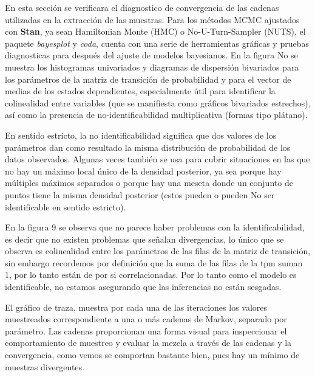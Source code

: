 \documentclass[a4paper]{article}\usepackage[]{graphicx}\usepackage[]{color}
\begin{document}
En esta sección se verificara el diagnostico de convergencia de las cadenas utilizadas en la extracción de las muestras. Para los métodos MCMC ajustados con \textbf{Stan}, ya sean Hamiltonian Monte (HMC) o No-U-Turn-Sampler (NUTS), el paquete \emph{bayesplot} y \emph{coda}, cuenta con una serie de herramientas gráficas y pruebas diagnosticas para después del ajuste de modelos bayesianos. En la figura No se muestra los histogramas univariados y diagramas de dispersión bivariados para los parámetros de la matriz de transición de probabilidad y para el vector de medias de los estados dependientes, especialmente útil para identificar la colinealidad entre variables (que se manifiesta como gráficos bivariados estrechos), así como la presencia de no-identificabilidad multiplicativa (formas tipo plátano).

En sentido estricto, la no identificabilidad significa que dos valores de los parámetros dan como resultado la misma distribución de probabilidad de los datos observados. Algunas veces también se usa para cubrir situaciones en las que no hay un máximo local único de la densidad posterior, ya sea porque hay múltiples máximos separados o porque hay una meseta donde un conjunto de puntos tiene la misma densidad posterior (estos pueden o pueden No ser identificable en sentido estricto).

En la figura 9 se observa que no parece haber problemas con la identificabilidad, es decir que no existen problemas que señalan divergencias, lo único que se observa es colinealidad entre los parámetros de las filas de la matriz de transición, sin embargo recordemos por definición que la suma de las filas de la tpm suman 1, por lo tanto están de por si correlacionadas. Por lo tanto como el modelo es identificable, no estamos asegurando que las inferencias no están sesgadas.

\vspace{5mm} %

El gráfico de traza, muestra por cada una de las iteraciones los valores muestreados correspondiente a una o más cadenas de Markov, separado por parámetro. Las cadenas proporcionan una forma visual para inspeccionar el comportamiento de muestreo y evaluar la mezcla a través de las cadenas y la convergencia, como vemos se comportan bastante bien, pues hay un mínimo de muestras divergentes.
\end{document}
